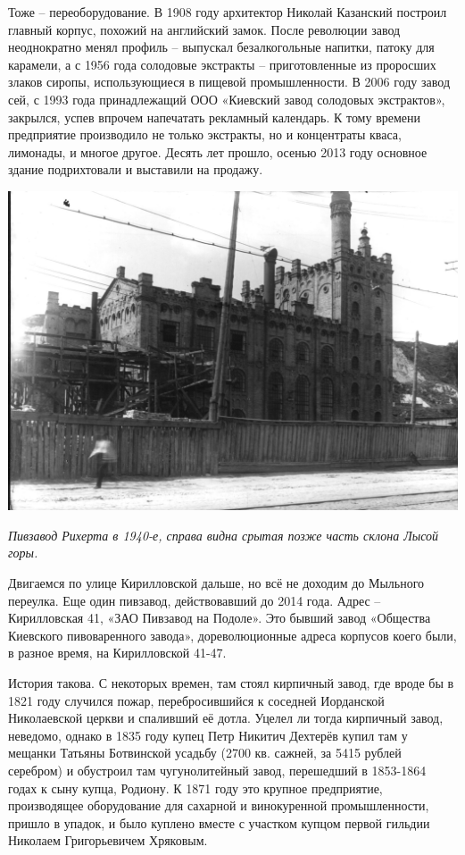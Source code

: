Тоже – переоборудование. В 1908 году архитектор Николай Казанский построил главный корпус, похожий на английский замок. После революции завод неоднократно менял профиль – выпускал безалкогольные напитки, патоку для карамели, а с 1956 года солодовые экстракты – приготовленные из проросших злаков сиропы, использующиеся в пищевой промышленности. В 2006 году завод сей, с 1993 года принадлежащий ООО «Киевский завод солодовых экстрактов», закрылся, успев впрочем напечатать рекламный календарь. К тому времени предприятие производило не только экстракты, но и концентраты кваса, лимонады, и многое другое. Десять лет прошло, осенью 2013 году основное здание подрихтовали и выставили на продажу. 

\begin{center}
\includegraphics[width=\linewidth]{chast-kirvys/lys02/1940-riherta.jpg}

\textit{Пивзавод Рихерта в 1940-е, справа видна срытая позже часть склона Лысой горы.}
\end{center}

Двигаемся по улице Кирилловской дальше, но всё не доходим до Мыльного переулка. Еще один пивзавод, действовавший до 2014 года. Адрес – Кирилловская 41, «ЗАО Пивзавод на Подоле». Это бывший завод «Общества Киевского пивоваренного завода», дореволюционные адреса корпусов коего были, в разное время, на Кирилловской 41-47.

История такова. С некоторых времен, там стоял кирпичный завод, где вроде бы в 1821 году случился пожар, перебросившийся к соседней Иорданской Николаевской церкви и спаливший её дотла. Уцелел ли тогда кирпичный завод, неведомо, однако в 1835 году купец Петр Никитич Дехтерёв купил там у мещанки Татьяны Ботвинской усадьбу (2700 кв. сажней, за 5415 рублей серебром) и обустроил там чугунолитейный завод, перешедший в 1853-1864 годах к сыну купца, Родиону. К 1871 году это крупное предприятие, производящее оборудование для сахарной и винокуренной промышленности, пришло в упадок, и было куплено вместе с участком купцом первой гильдии Николаем Григорьевичем Хряковым.

